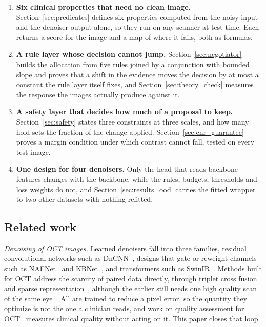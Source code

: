 \begin{enumerate}
\item \textbf{Six clinical properties that need no clean image.}
Section~\ref{sec:predicates} defines six properties computed from the noisy input and the denoiser
output alone, so they run on any scanner at test time. Each returns a score for the image and a map
of where it fails, both as formulas.

\item \textbf{A rule layer whose decision cannot jump.}
Section~\ref{sec:negotiator} builds the allocation from five rules joined by a conjunction with
bounded slope and proves that a shift in the evidence moves the decision by at most a constant the
rule layer itself fixes, and Section~\ref{sec:theory_check} measures the response the images
actually produce against it.

\item \textbf{A safety layer that decides how much of a proposal to keep.}
Section~\ref{sec:safety} states three constraints at three scales, and how many hold sets the
fraction of the change applied. Section~\ref{sec:cnr_guarantee} proves a margin condition under which
contrast cannot fall, tested on every test image.

\item \textbf{One design for four denoisers.}
Only the head that reads backbone features changes with the backbone, while the rules, budgets,
thresholds and loss weights do not, and Section~\ref{sec:results_ood} carries the fitted wrapper to
two other datasets with nothing refitted.
\end{enumerate}

\subsection{Related work}
\label{sec:related}
\emph{Denoising of OCT images.} Learned denoisers fall into three families, residual convolutional
networks such as DnCNN~\cite{zhang2017beyond}, designs that gate or reweight channels such as
NAFNet~\cite{chen2022simple} and KBNet~\cite{zhang2023kbnet}, and transformers such as
SwinIR~\cite{liang2021swinir}. Methods built for OCT address the scarcity of paired data directly,
through triplet cross fusion~\cite{geng2022triplet} and sparse representation~\cite{fang2013fast},
although the earlier still needs one high quality scan of the same eye~\cite{fang2012sparsity}. All
are trained to reduce a pixel error, so the quantity they optimize is not the one a clinician reads,
and work on quality assessment for OCT~\cite{wang2019quality} measures clinical quality without
acting on it. This paper closes that loop.

